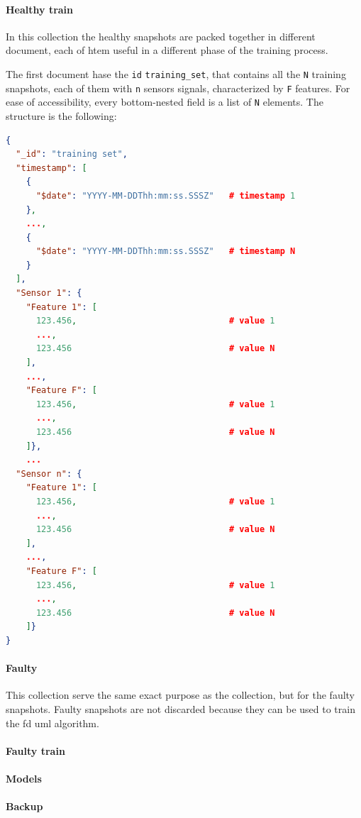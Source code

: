 \paragraph{Healthy train}
In this collection the healthy snapshots are packed together in different document, each of htem useful in a different phase of the training process. 

{The first document hase the \texttt{id} \texttt{training\_set}, that contains all the \texttt{N} training snapshots, each of them with \texttt{n} sensors signals, characterized by \texttt{F} features. For ease of accessibility, every bottom-nested field is a list of \texttt{N} elements. The structure is the following:}

\begin{lstlisting}[language=json,firstnumber=1]
{
  "_id": "training set",
  "timestamp": [
    {
      "$date": "YYYY-MM-DDThh:mm:ss.SSSZ" 	# timestamp 1
    },  
	...,
    {   
      "$date": "YYYY-MM-DDThh:mm:ss.SSSZ" 	# timestamp N
    }
  ],
  "Sensor 1": {
    "Feature 1": [
      123.456,								# value 1
      ...,
      123.456								# value N
    ],
	...,
	"Feature F": [
      123.456,								# value 1
      ...,
      123.456								# value N
    ]},
	...
  "Sensor n": {
    "Feature 1": [
      123.456,								# value 1
      ...,
      123.456								# value N
    ],
	...,
	"Feature F": [
      123.456,								# value 1
      ...,
      123.456								# value N
    ]}
}
\end{lstlisting}

\paragraph{Faulty}
This collection serve the same exact purpose as the  collection, but for the faulty snapshots. Faulty snapshots are not discarded because they can be used to train the \gls{fd} \gls{uml} algorithm.

\paragraph{Faulty train}

\paragraph{Models}


\paragraph{Backup}

